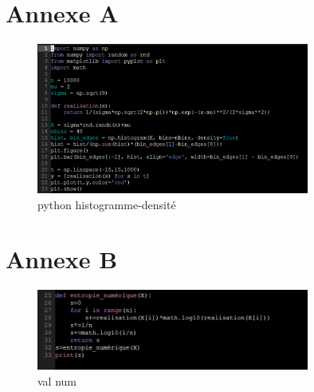 \documentclass[a4paper]{article}
\begin{document}
\section{Annexe A}
\begin{figure}[h]
  \centering
  \includegraphics[width=0.8\textwidth]{1.png}
  \caption{python histogramme-densité}
\end{figure}

\section{Annexe B}
\begin{figure}[h]
  \centering
  \includegraphics[width=0.8\textwidth]{2.png}
  \caption{val num}
\end{figure}
\end{document}
